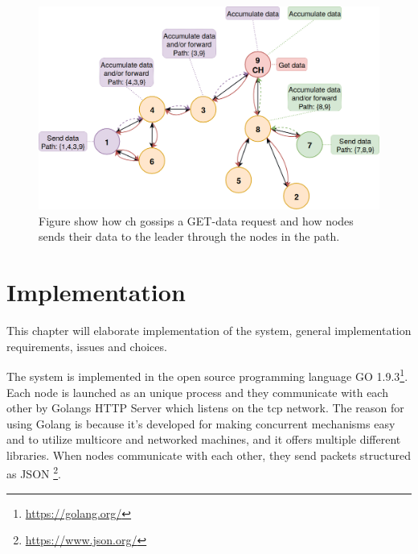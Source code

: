 \documentclass[USenglish]{uit-thesis}
\begin{document}

\begin{figure}
\centering
\includegraphics[width=\textwidth]{gatherSendData1.png}
\caption{Figure show how \gls{ch} gossips a GET-data request and how  nodes sends their data to the leader through the nodes in the path.}
\label{fig:gaterSendData}
\end{figure}



\chapter{Implementation} \label{chap:implementation}
\glsresetall

This chapter will elaborate implementation of the system, general implementation requirements, issues and choices. 

The system is implemented in the open source programming language GO 1.9.3\footnote{\url{https://golang.org/}}. Each node is launched as an unique process and they communicate with each other by Golangs HTTP Server which listens on the \gls{tcp} network. The reason for using Golang is because it's developed for making concurrent mechanisms easy and to utilize multicore and networked machines, and it offers multiple different libraries. When nodes communicate with each other, they send packets structured as JSON \footnote{\url{https://www.json.org/}}.
\end{document}
